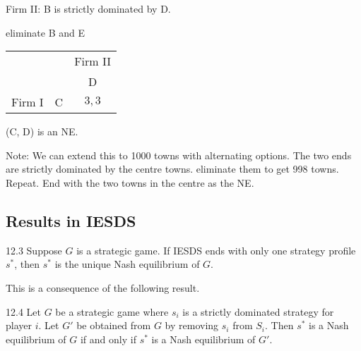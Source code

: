 \documentclass[12pt,letterpaper]{report}
\begin{document}
\begin{ex}
\begin{minipage}{0.5\textwidth}
    Firm II: B is strictly dominated by D.
  \end{minipage}

  \hspace{0.3\textwidth} \scalebox{2}{$\downarrow$} \quad eliminate B and E

  \begin{minipage}{0.5\textwidth}
    \centering
    \renewcommand{\arraystretch}{1.25}
    \begin{tabular}{c c |c|}
      \multicolumn{2}{c}{} & \multicolumn{1}{c}{Firm II} \\
      \multicolumn{2}{c}{} & \multicolumn{1}{c}{D} \\
      \cline{3-3}
      \multirow{1}{*}{Firm I} & C & $3, 3$ \\
      \cline{3-3}
    \end{tabular}
  \end{minipage}\hfill\begin{minipage}{0.5\textwidth}
    (C, D) is an NE.
  \end{minipage}
\end{ex}

Note: We can extend this to 1000 towns with alternating options.
The two ends are strictly dominated by the centre towns.
eliminate them to get 998 towns.
Repeat.
End with the two towns in the centre as the NE.

\pagebreak
\subsection{Results in IESDS}

\begin{thm}{}{12.3}
  Suppose $G$ is a strategic game.
  If IESDS ends with only one strategy profile $s^*$, then $s^*$ is the unique Nash equilibrium of
  $G$.
\end{thm}

This is a consequence of the following result.

\begin{thm}{}{12.4}
  Let $G$ be a strategic game where $s_i$ is a strictly dominated strategy for player $i$.
  Let $G'$ be obtained from $G$ by removing $s_i$ from $S_i$.
  Then $s^*$ is a Nash equilibrium of $G$ if and only if $s^*$ is a Nash equilibrium of $G'$.
\end{thm}
\end{document}
